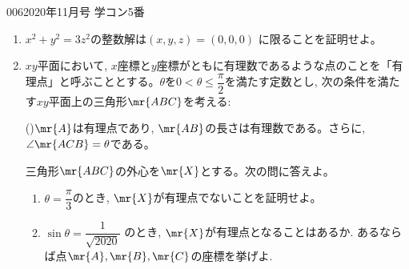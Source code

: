 \begin{prob}{006}{}{2020年11月号 学コン5番}
\begin{enumerate}
 \item $x^2 + y^2 = 3z^2$の整数解は$(x,y,z) = (0,0,0)$ に限ることを証明せよ。
 \item $xy$平面において, $x$座標と$y$座標がともに有理数であるような点のことを「有理点」と呼ぶこととする。$\theta$を$0< \theta \leq \dfrac{\pi}{2}$を満たす定数とし, 次の条件を満たす$xy$平面上の三角形$\mr{ABC}$を考える:
 \begin{center}
 ()\qquad $\mr{A}$は有理点であり, $\mr{AB}$の長さは有理数である。さらに, $\angle{\mr{ACB}} = \theta$である。
 \end{center}
 三角形$\mr{ABC}$の外心を$\mr{X}$とする。次の問に答えよ。
 \begin{enumerate}
  \item $\theta = \dfrac{\pi}{3}$のとき, $\mr{X}$が有理点でないことを証明せよ。
  \item $\sin{\theta}= \dfrac{1}{\sqrt{2020}}$ のとき, $\mr{X}$が有理点となることはあるか. あるならば点$\mr{A},\mr{B},\mr{C}$の座標を挙げよ.
 \end{enumerate}
\end{enumerate}
\end{prob}

